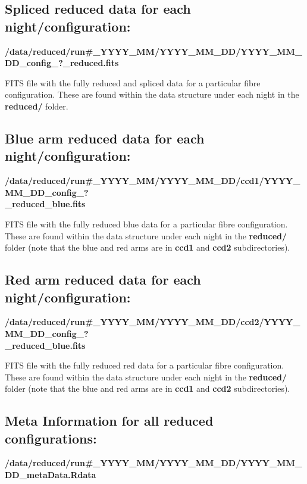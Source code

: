 \documentclass[12pt]{article}
\begin{document}
 
\subsection{Spliced reduced data for each night/configuration:} 
 
 \textbf{/data/reduced/run\#\_YYYY\_MM/YYYY\_MM\_DD/YYYY\_MM\_DD\_config\_?\_reduced.fits} 
 
 FITS file with the fully reduced and spliced data for a particular fibre configuration. These are found within the data structure under each night in the \textbf{reduced/} folder. 

  
\subsection{Blue arm reduced data for each night/configuration:} 
   
   \textbf{/data/reduced/run\#\_YYYY\_MM/YYYY\_MM\_DD/ccd1/YYYY\_MM\_DD\_config\_? \\ \_reduced\_blue.fits} 
   
 FITS file with the fully reduced blue data for a particular fibre configuration. These are found within the data structure under each night in the \textbf{reduced/} folder (note that the blue and red arms are in \textbf{ccd1} and \textbf{ccd2} subdirectories). 

 
  
\subsection{Red arm reduced data for each night/configuration:} 
  
  \textbf{/data/reduced/run\#\_YYYY\_MM/YYYY\_MM\_DD/ccd2/YYYY\_MM\_DD\_config\_? \\ \_reduced\_blue.fits} 
  
  FITS file with the fully reduced red data for a particular fibre configuration. These are found within the data structure under each night in the \textbf{reduced/} folder (note that the blue and red arms are in \textbf{ccd1} and \textbf{ccd2} subdirectories). 

 

\subsection{Meta Information for all reduced configurations:} 
 
 \textbf{/data/reduced/run\#\_YYYY\_MM/YYYY\_MM\_DD/YYYY\_MM\_DD\_metaData.Rdata} 
 
\end{document}
